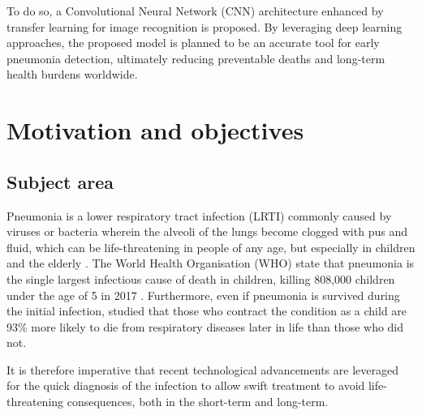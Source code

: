 \documentclass[12pt]{report}
\newcommand{\para}{\vspace{7pt}\noindent}
\begin{document}
\para To do so, a Convolutional Neural Network (CNN) architecture enhanced by transfer learning for image recognition is proposed.
By leveraging deep learning approaches, the proposed model is planned to be an accurate tool for early pneumonia detection, ultimately
reducing preventable deaths and long-term health burdens worldwide.


\chapter{Motivation and objectives}

\section{Subject area}

Pneumonia is a lower respiratory tract infection (LRTI) commonly caused by viruses or bacteria wherein the alveoli of the lungs 
become clogged with pus and fluid, which can be life-threatening in people of any age, but especially in children and the elderly
\autocite{nhsPneumonia2017}. The World Health Organisation (WHO) state that pneumonia is the single largest infectious cause of death 
in children, killing 808,000 children under the age of 5 in 2017 \autocite{whoPneumonia}. Furthermore, even if pneumonia is survived during the 
initial infection, \textcite{allinsonEarlyChildhoodLower2023} studied that those who contract the condition as a child are 93\% more likely to die 
from respiratory diseases later in life than those who did not.

\para It is therefore imperative that recent technological advancements are leveraged for the quick diagnosis of the infection to allow swift 
treatment to avoid life-threatening consequences, both in the short-term and long-term. 
\end{document}
